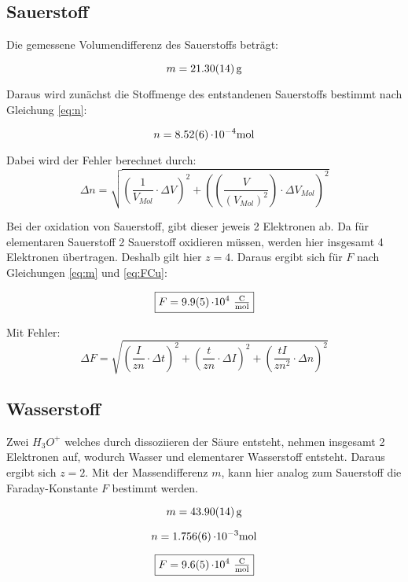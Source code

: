 \subsection{Sauerstoff}

Die gemessene Volumendifferenz des Sauerstoffs beträgt:

\[m =  \SI{21,30 \pm 0,14}{\gram}\]

Daraus wird zunächst die Stoffmenge des entstandenen Sauerstoffs bestimmt nach Gleichung \ref{eq:n}:

\[n = \SI{8,52 \pm 0,06}{\cdot 10 ^{-4}\mole}\]

Dabei wird der Fehler berechnet durch:
\begin{equation}
    \Delta n = \sqrt{\left(\frac{1}{V_{Mol}} \cdot \Delta V\right)^2 + \left((\frac{V}{(V_{Mol})^2}) \cdot \Delta V_{Mol}\right)^2}
\end{equation}

Bei der oxidation von Sauerstoff, gibt dieser jeweis 2 Elektronen ab. Da für elementaren Sauerstoff 2 Sauerstoff oxidieren müssen, werden hier insgesamt 4 Elektronen übertragen.
Deshalb gilt hier $z=4$. Daraus ergibt sich für $F$ nach Gleichungen \ref{eq:m} und \ref{eq:FCu}:

\[\boxed{F = \SI{9,9\pm 0,5}{\cdot 10^{4}\ \tfrac{\coulomb}{\mole}}}\]

Mit Fehler:
\begin{equation}
    \Delta F = \sqrt{\left(\frac{I}{zn}  \cdot \Delta t\right)^2 + \left(\frac{t}{zn} \cdot \Delta I\right)^2 + \left(\frac{t I}{z n^2} \cdot \Delta n\right)^2}
\end{equation}


\subsection{Wasserstoff}

Zwei $H_3O^+$ welches durch dissoziieren der Säure entsteht, nehmen insgesamt 2 Elektronen auf, wodurch Wasser und elementarer Wasserstoff entsteht.
Daraus ergibt sich $z=2$. Mit der Massendifferenz $m$, kann hier analog zum Sauerstoff die Faraday-Konstante $F$ bestimmt werden.

\[m = \SI{43,90 \pm 0,14}{\gram}\]

\[n = \SI{1,756 \pm 0,006}{\cdot 10 ^{-3}\mole}\]

\[\boxed{F = \SI{9,6\pm 0,5}{\cdot 10^{4}\ \tfrac{\coulomb}{\mole}}}\]
